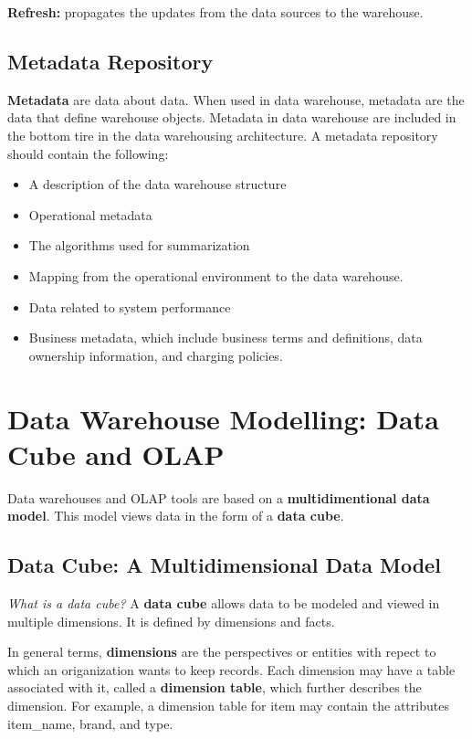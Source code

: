 			{\bf Refresh:} propagates the updates from the data sources to the warehouse. 

	\subsection{Metadata Repository}

		{\bf Metadata} are data about data. When used in data warehouse, metadata are the
		data that define warehouse objects. Metadata in data warehouse are included in the
		bottom tire in the data warehousing architecture. A metadata repository should 
		contain the following:

			\begin{itemize}
				\item A description of the data warehouse structure
				\item Operational metadata
				\item The algorithms used for summarization
				\item Mapping from the operational environment to the data warehouse.
				\item Data related to system performance
				\item Business metadata, which include business terms and definitions, data
				ownership information, and charging policies.  
			\end{itemize}

\section{Data Warehouse Modelling: Data Cube and OLAP}
	
	Data warehouses and OLAP tools are based on a {\bf multidimentional data model}. This
	model views data in the form of a {\bf data cube}.
	
	\subsection{Data Cube: A Multidimensional Data Model}
		{\it What is a data cube?} A {\bf data cube} allows data to be modeled and viewed 
		in multiple dimensions. It is defined by dimensions and facts.

		In general terms, {\bf dimensions} are the perspectives or entities with repect to
		which an origanization wants to keep records. Each dimension may have a table 
		associated with it, called a {\bf dimension table}, which further describes the
		dimension. For example, a dimension table for item may contain the attributes
		item\_name, brand, and type. 

